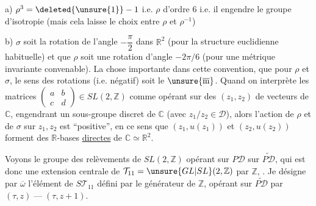a) $\rho^3=\deleted{\unsure{1}}-1$ i.e. $\rho$ d'ordre $6$ i.e. il engendre le groupe d'isotropie  (mais cela laisse le choix entre $\rho$ et $\rho^{-1}$)

b) $\sigma$ soit la rotation de l'angle $-\dfrac\pi2$ dans $\mathbb R^2$ (pour la structure euclidienne habituelle) et que $\rho$ soit une rotation d'angle $-2\pi/6$ (pour une métrique invariante convenable).
La chose importante dans cette convention,  que pour $\rho$ et $\sigma$, le sens des rotations (i.e. négatif) soit le $\unsure{\overline{\mathrm m}}$.
Quand on interprète  les matrices $\begin{pmatrix}a&b\\c&d\end{pmatrix}\in SL(2,\mathbb Z)$ comme opérant sur des  $(z_1,z_2)$ de vecteurs de $\mathbb C$, engendrant un sous-groupe discret de $\mathbb C$ (avec $z_1/z_2\in\mathcal D$), alors l'action de $\rho$ et de $\sigma$ sur $z_1,z_2$ est ``positive'', en ce sens que $(z_1,u(z_1))$ et $(z_2,u(z_2))$ forment des $\mathbb R$-bases \uline{directes} de $\mathbb C\simeq\mathbb R^2$.

Voyons le groupe des relèvements de $SL(2,\mathbb Z)$ opérant sur $P\mathcal D$ sur $\widetilde{P\mathcal D}$, qui est donc une extension centrale de $\mathcal T_{11}=\unsure{GL|SL}(2,\mathbb Z)$ par $\mathbb Z$, .
Je désigne par \deleted{$\unsure{\omega}$} $\overline\omega$ l'élément de  $S\mathcal T_{11}$ défini par le générateur de $\mathbb Z$, opérant sur $\widetilde{P\mathcal D}$ par $(\tau,z)\mathrel{\text{---}}(\tau,z+1)$.

